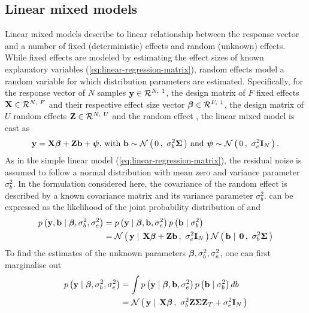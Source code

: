 \subsection{Linear mixed models}
\label{subsection:lmm}
Linear mixed models describe to linear relationship between the response vector and a number of fixed (deterministic) effects and random (unknown) effects. While fixed effects are modeled by estimating the effect sizes of known explanatory variables (\cref{eq:linear-regression-matrix}), random effects model a random variable for which distribution parameters are estimated. Specifically, for the response vector of \(N\) samples \(\boldsymbol{\mathbf{y}} \in \mathcal{R}^{N,~1}\), the design matrix of \(F\) fixed effects \(\boldsymbol{\mathbf{X}} \in \mathcal{R}^{N,~F}\) and their respective effect size vector \(\boldsymbol{\mathbf{\beta}} \in \mathcal{R}^{F,~1}\), the design matrix of \(U\) random effects \(\boldsymbol{\mathbf{Z}} \in \mathcal{R}^{N,~U}\) and the random effect , the linear mixed model is cast as
%
\begin{equation}
\boldsymbol{\mathbf{y}} =\boldsymbol{\mathbf{X}}\boldsymbol{\mathbf{\beta}} +\boldsymbol{\mathbf{Z}}\boldsymbol{\mathbf{b}}+\boldsymbol{\mathbf{\psi}},\, \text{with } \boldsymbol{\mathbf{b}} \sim \mathcal{N}\left(\,{0}\,,~{\sigma_b^2\boldsymbol{\mathbf{\Sigma}}}\,\right)\,\text{and  }\boldsymbol{\mathbf{\psi}} \sim\mathcal{N}\left(\,{0}\,,~{\sigma_e^2\boldsymbol{\mathbf{I}}_N}\,\right).
\label{eq:lmm}
\end{equation}
%
As in the simple linear model (\cref{eq:linear-regression-matrix}), the residual noise is assumed to follow a normal distribution with mean zero and variance parameter \(\sigma_b^2\). In the formulation considered here, the covariance of the random effect is described by a known covariance matrix \tmat{\Sigma} and its variance parameter \(\sigma_b^2\). 
%
 can be expressed as the likelihood  of the joint probability distribution of  and 
\begin{align}
p\left(\boldsymbol{\mathbf{y}}, \boldsymbol{\mathbf{b}}\mid \boldsymbol{\mathbf{\beta}},\sigma_b^2, \sigma_e^2\right) &= p\left(\boldsymbol{\mathbf{y}} \mid \boldsymbol{\mathbf{\beta}}, \boldsymbol{\mathbf{b}}, \sigma_e^2\right)p\left(\boldsymbol{\mathbf{b}}\mid \sigma_b^2\right) \label{eq:lmm-prob} \\
&= \mathcal{N}\left(\,{\boldsymbol{\mathbf{y}} \mid \, \boldsymbol{\mathbf{X\beta}} + \boldsymbol{\mathbf{Zb}}}\,,~{\sigma_e^2\boldsymbol{\mathbf{I}}_{N}}\,\right) \mathcal{N}\left(\,{\boldsymbol{\mathbf{b}} \mid \,\boldsymbol{\mathbf{0}}}\,,~{\sigma_b^2\boldsymbol{\mathbf{\Sigma}}}\,\right)\label{eq:lmm-norm}
\end{align}
%
To find the estimates of the unknown parameters \(\boldsymbol{\mathbf{\beta}}, \sigma_b^2, \sigma_e^2\), one can first marginalise out  
%
\begin{align}
p\left(\boldsymbol{\mathbf{y}} \mid \boldsymbol{\mathbf{\beta}},\sigma_b^2, \sigma_e^2\right) &= \int p\left(\boldsymbol{\mathbf{y}} \mid \boldsymbol{\mathbf{\beta}}, \boldsymbol{\mathbf{b}}, \sigma_e^2\right)p\left(\boldsymbol{\mathbf{b}}\mid \sigma_b^2\right) db \label{eq:lmm-marginal-prob} \\
&= \mathcal{N}\left(\,{\boldsymbol{\mathbf{y}} \mid  \, \boldsymbol{\mathbf{X\beta}}}\,,~{\sigma_b^2\boldsymbol{\mathbf{Z}}\boldsymbol{\mathbf{\Sigma}}\boldsymbol{\mathbf{Z}}_{T} + \sigma_e^2\boldsymbol{\mathbf{I}}_{N}}\,\right)  \label{eq:lmm-marginal-norm} 
\end{align}
